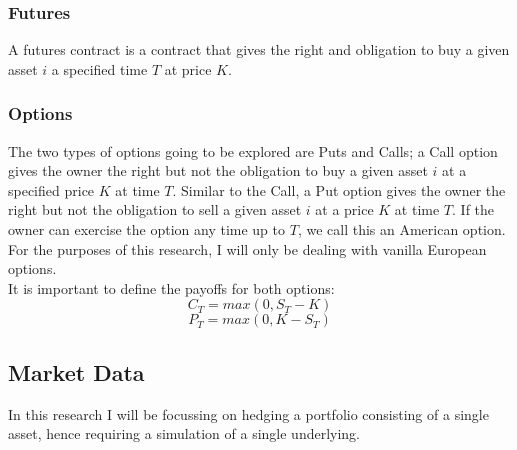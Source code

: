 \documentclass[12pt]{article}
\numberwithin{equation}{section}
\begin{document}
\subsubsection{Futures}
A futures contract is a contract that gives the right and obligation to buy a 
given asset $i$ a specified time $T$ at price $K$. 
\subsubsection{Options}
The two types of options going to be explored are Puts and Calls; a Call option 
gives the owner the right but not the obligation to buy a given asset $i$ at 
a specified price $K$ at time $T$. Similar to the Call, a Put option gives the 
owner the right but not the obligation to sell a given asset $i$ at a price $K$ 
at time $T$. If the owner can exercise the option any time up to $T$, we call 
this an American option. For the purposes of this research, I will only be 
dealing with vanilla European options.\\ 
It is important to define the payoffs for both options: 
\begin{equation}
C_T = max(0,S_T-K)
\end{equation}
\begin{equation}
P_T = max(0,K-S_T)
\end{equation}



\subsection{Market Data}
In this research I will be focussing on hedging a portfolio consisting of a single 
asset, hence requiring a simulation of a single underlying.
\end{document}

